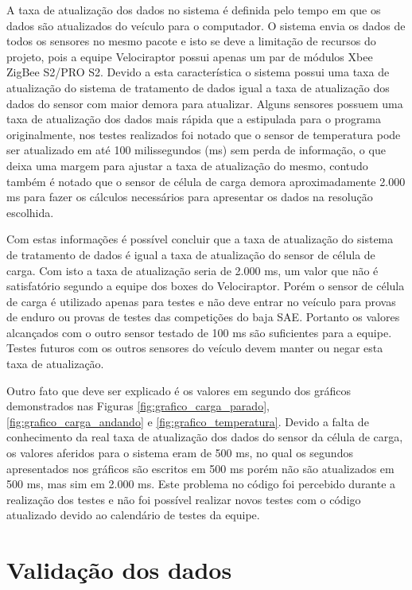 A taxa de atualização dos dados no sistema é definida pelo tempo em que os dados são atualizados do veículo para o computador. O sistema envia os dados de todos os sensores no mesmo pacote e isto se deve a limitação de recursos do projeto, pois a equipe Velociraptor possui apenas um par de módulos Xbee ZigBee S2/PRO S2. Devido a esta característica o sistema possui uma taxa de atualização do sistema de tratamento de dados igual a taxa de atualização dos dados do sensor com maior demora para atualizar. Alguns sensores possuem uma taxa de atualização dos dados mais rápida que a estipulada para o programa originalmente, nos testes realizados foi notado que o sensor de temperatura pode ser atualizado em até 100 milissegundos (ms) sem perda de informação, o que deixa uma margem para ajustar a taxa de atualização do mesmo, contudo também é notado que o sensor de célula de carga demora aproximadamente 2.000 ms para fazer os cálculos necessários para apresentar os dados na resolução escolhida.

Com estas informações é possível concluir que a taxa de atualização do sistema de tratamento de dados é igual a taxa de atualização do sensor de célula de carga. Com isto a taxa de atualização seria de 2.000 ms, um valor que não é satisfatório segundo a equipe dos boxes do Velociraptor. Porém o sensor de célula de carga é utilizado apenas para testes e não deve entrar no veículo para provas de enduro ou provas de testes das competições do baja SAE. Portanto os valores alcançados com o outro sensor testado de 100 ms são suficientes para a equipe. Testes futuros com os outros sensores do veículo devem manter ou negar esta taxa de atualização.

Outro fato que deve ser explicado é os valores em segundo dos gráficos demonstrados nas Figuras \ref{fig:grafico_carga_parado}, \ref{fig:grafico_carga_andando} e \ref{fig:grafico_temperatura}. Devido a falta de conhecimento da real taxa de atualização dos dados do sensor da célula de carga, os valores aferidos para o sistema eram de 500 ms, no qual os segundos apresentados nos gráficos são escritos em 500 ms porém não são atualizados em 500 ms, mas sim em 2.000 ms. Este problema no código foi percebido durante a realização dos testes e não foi possível realizar novos testes com o código atualizado devido ao calendário de testes da equipe.

\section{Validação dos dados}
\label{sec:validacao}

